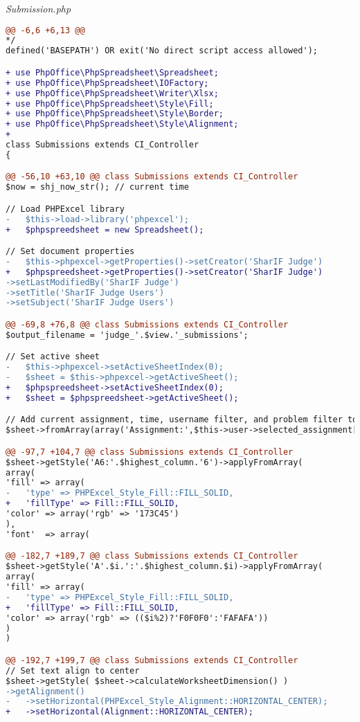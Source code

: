 	\textit{Submission.php}
\begin{lstlisting}[language=diff, basicstyle=\ttfamily, frame=single,
columns=fullflexible, keepspaces=true, breaklines=true]
@@ -6,6 +6,13 @@
*/
defined('BASEPATH') OR exit('No direct script access allowed');

+ use PhpOffice\PhpSpreadsheet\Spreadsheet;
+ use PhpOffice\PhpSpreadsheet\IOFactory;
+ use PhpOffice\PhpSpreadsheet\Writer\Xlsx;
+ use PhpOffice\PhpSpreadsheet\Style\Fill;
+ use PhpOffice\PhpSpreadsheet\Style\Border;
+ use PhpOffice\PhpSpreadsheet\Style\Alignment;
+ 
class Submissions extends CI_Controller
{

@@ -56,10 +63,10 @@ class Submissions extends CI_Controller
$now = shj_now_str(); // current time

// Load PHPExcel library
-   $this->load->library('phpexcel');
+   $phpspreedsheet = new Spreadsheet();

// Set document properties
-   $this->phpexcel->getProperties()->setCreator('SharIF Judge')
+   $phpspreedsheet->getProperties()->setCreator('SharIF Judge')
->setLastModifiedBy('SharIF Judge')
->setTitle('SharIF Judge Users')
->setSubject('SharIF Judge Users')

@@ -69,8 +76,8 @@ class Submissions extends CI_Controller
$output_filename = 'judge_'.$view.'_submissions';

// Set active sheet
-   $this->phpexcel->setActiveSheetIndex(0);
-   $sheet = $this->phpexcel->getActiveSheet();
+   $phpspreedsheet->setActiveSheetIndex(0);
+   $sheet = $phpspreedsheet->getActiveSheet();

// Add current assignment, time, username filter, and problem filter to document
$sheet->fromArray(array('Assignment:',$this->user->selected_assignment['name']), null, 'A1', true);

@@ -97,7 +104,7 @@ class Submissions extends CI_Controller
$sheet->getStyle('A6:'.$highest_column.'6')->applyFromArray(
array(
'fill' => array(
-   'type' => PHPExcel_Style_Fill::FILL_SOLID,
+   'fillType' => Fill::FILL_SOLID,
'color' => array('rgb' => '173C45')
),
'font'  => array(

@@ -182,7 +189,7 @@ class Submissions extends CI_Controller
$sheet->getStyle('A'.$i.':'.$highest_column.$i)->applyFromArray(
array(
'fill' => array(
-   'type' => PHPExcel_Style_Fill::FILL_SOLID,
+   'fillType' => Fill::FILL_SOLID,
'color' => array('rgb' => (($i%2)?'F0F0F0':'FAFAFA'))
)
)

@@ -192,7 +199,7 @@ class Submissions extends CI_Controller
// Set text align to center
$sheet->getStyle( $sheet->calculateWorksheetDimension() )
->getAlignment()
-   ->setHorizontal(PHPExcel_Style_Alignment::HORIZONTAL_CENTER);
+   ->setHorizontal(Alignment::HORIZONTAL_CENTER);


\end{lstlisting}
